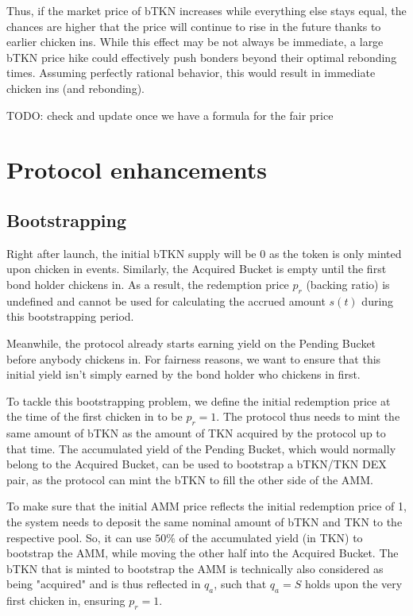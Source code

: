 \documentclass{article}
\begin{document}
Thus, if the market price of bTKN increases while everything else stays equal, the chances are higher that the price will continue to rise in the future thanks to earlier chicken ins. While this effect may be not always be immediate, a large bTKN price hike could effectively push bonders beyond their optimal rebonding times.
Assuming perfectly rational behavior, this would result in immediate chicken ins (and rebonding).

TODO: check and update once we have a formula for the fair price

\section{Protocol enhancements}
\subsection{Bootstrapping}
Right after launch, the initial bTKN supply will be 0 as the token is only minted upon chicken in events. Similarly, the Acquired Bucket is empty until the first bond holder chickens in. As a result, the redemption price $p_r$ (backing ratio) is undefined and cannot be used for calculating the accrued amount $s(t)$ during this bootstrapping period.

Meanwhile, the protocol already starts earning yield on the Pending Bucket before anybody chickens in. For fairness reasons, we want to ensure that this initial yield isn't simply earned by the bond holder who chickens in first.

To tackle this bootstrapping problem, we define the initial redemption price at the time of the first chicken in to be $p_r = 1$. The protocol thus needs to mint the same amount of bTKN as the amount of TKN acquired by the protocol up to that time. The accumulated yield of the Pending Bucket, which would normally belong to the Acquired Bucket, can be used to bootstrap a bTKN/TKN DEX pair, as the protocol can mint the bTKN to fill the other side of the AMM.

To make sure that the initial AMM price reflects the initial redemption price of 1, the system needs to deposit the same nominal amount of bTKN and TKN to the respective pool. So, it can use $50\%$ of the accumulated yield (in TKN) to bootstrap the AMM, while moving the other half into the Acquired Bucket. The bTKN that is minted to bootstrap the AMM is technically also considered as being "acquired" and is thus reflected in $q_a$, such that $q_a = S$ holds upon the very first chicken in, ensuring $p_r = 1$.
\end{document}
